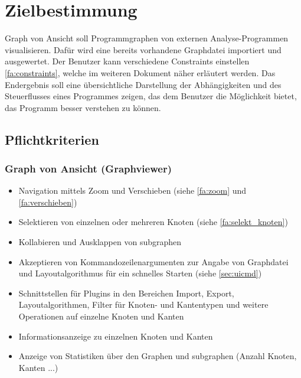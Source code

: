 \chapter{Zielbestimmung}

Graph von Ansicht soll Programmgraphen von externen Analyse-Programmen visualisieren. Dafür wird eine bereits vorhandene Graphdatei importiert und ausgewertet. Der Benutzer kann verschiedene Constraints einstellen \ref{fa:constraints}, welche im weiteren Dokument näher erläutert werden.
Das Endergebnis soll eine übersichtliche Darstellung der Abhängigkeiten und des Steuerflusses eines Programmes zeigen, das dem Benutzer die Möglichkeit bietet, das Programm besser verstehen zu können.

\section{Pflichtkriterien}

\subsection{Graph von Ansicht (Graphviewer)}
  \begin{itemize}
    \item Navigation mittels Zoom und Verschieben (siehe \ref{fa:zoom} und \ref{fa:verschieben})
    \item Selektieren von einzelnen oder mehreren Knoten (siehe \ref{fa:selekt_knoten})
    \item Kollabieren und Ausklappen von \gls{subgraph}en %
    \item Akzeptieren von Kommandozeilenargumenten zur Angabe von Graphdatei und Layoutalgorithmus für ein schnelles Starten (siehe \ref{sec:uicmd})
    \item Schnittstellen für Plugins in den Bereichen Import, Export, Layoutalgorithmen, Filter für Knoten- und Kantentypen und weitere Operationen auf einzelne Knoten und Kanten
    \item Informationsanzeige zu einzelnen Knoten und Kanten %
    \item Anzeige von Statistiken über den Graphen und \gls{subgraph}en (Anzahl Knoten, Kanten ...) %
  \end{itemize}
  
